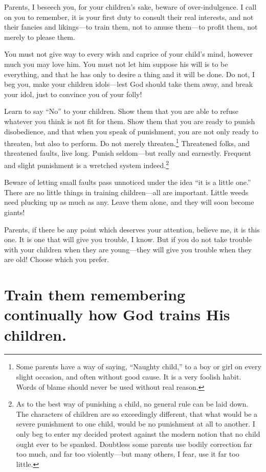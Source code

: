 \documentclass[
]{book}
\begin{document}
Parents, I beseech you, for your children's sake, beware of over-indulgence. I call on you to remember, it is your first duty to consult their real interests, and not their fancies and likings---to train them, not to amuse them---to profit them, not merely to please them.

You must not give way to every wish and caprice of your child's mind, however much you may love him. You must not let him suppose his will is to be everything, and that he has only to desire a thing and it will be done. Do not, I beg you, make your children idols---lest God should take them away, and break your idol, just to convince you of your folly!

Learn to say ``No'' to your children. Show them that you are able to refuse whatever you think is not fit for them. Show them that you are ready to punish disobedience, and that when you speak of punishment, you are not only ready to threaten, but also to perform. Do not merely threaten.\footnote{Some parents have a way of saying, ``Naughty child,'' to a boy or girl on every slight occasion, and often without good cause. It is a very foolish habit. Words of blame should never be used without real reason.} Threatened folks, and threatened faults, live long. Punish seldom---but really and earnestly. Frequent and slight punishment is a wretched system indeed.\footnote{As to the best way of punishing a child, no general rule can be laid down. The characters of children are so exceedingly different, that what would be a severe punishment to one child, would be no punishment at all to another. I only beg to enter my decided protest against the modern notion that no child ought ever to be spanked. Doubtless some parents use bodily correction far too much, and far too violently---but many others, I fear, use it far too little.}

Beware of letting small faults pass unnoticed under the idea ``it is a little one.'' There are no little things in training children---all are important. Little weeds need plucking up as much as any. Leave them alone, and they will soon become giants!

Parents, if there be any point which deserves your attention, believe me, it is this one. It is one that will give you trouble, I know. But if you do not take trouble with your children when they are young---they will give you trouble when they are old! Choose which you prefer.

\hypertarget{train-them-remembering-continually-how-god-trains-his-children.}{%
\chapter{Train them remembering continually how God trains His children.}\label{train-them-remembering-continually-how-god-trains-his-children.}}
\end{document}
